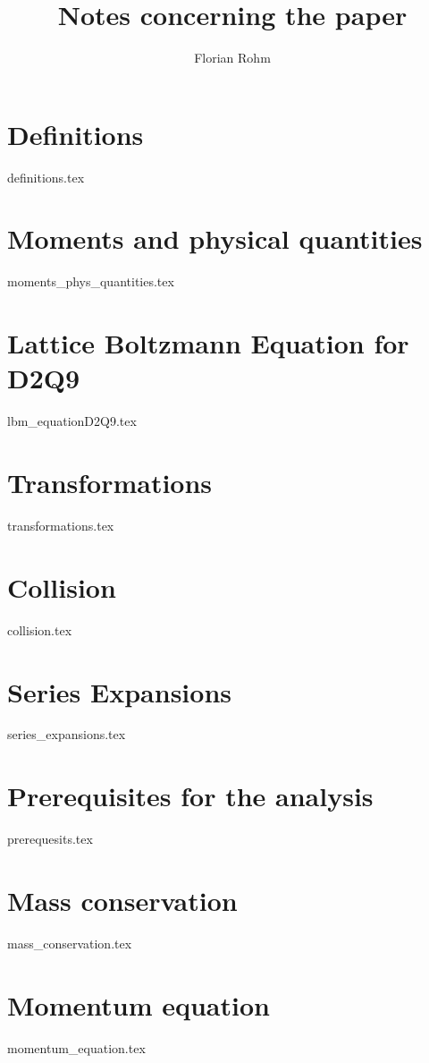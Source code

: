 \documentclass{article}
\title{Notes concerning the paper}
\author{Florian Rohm}
\begin{document}
\maketitle
\tableofcontents
\newpage
\listoftodos{}
\newpage


\section{Definitions}
\label{sec:Definitions}
{definitions.tex}

\section{Moments and physical quantities}
\label{sec:Moments and physical quantities}
{moments_phys_quantities.tex}

\section{Lattice Boltzmann Equation for D2Q9}
\label{sec:Lattice Boltzmann Equation for D2Q9}
{lbm_equationD2Q9.tex}

\section{Transformations}
\label{sec:Transformations}
{transformations.tex}

\section{Collision}
\label{sec:Collision}
{collision.tex}

\section{Series Expansions}
\label{sec:Series Expansions}
{series_expansions.tex}

\section{Prerequisites for the analysis}
\label{sec:Prerequisites for the analysis}
{prerequesits.tex}

\section{Mass conservation}
\label{sec:Mass conservation}
{mass_conservation.tex}

\section{Momentum equation}
\label{sec:Momentum equation}
{momentum_equation.tex}
\end{document}

